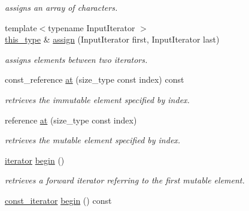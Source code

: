 \begin{DoxyCompactItemize}
\begin{DoxyCompactList}\small\item\em assigns an array of characters. \end{DoxyCompactList}\item 
\hypertarget{classhryky_1_1_string_aa9cd66f59bbf315959cdcf1e4dd627a2}{{\footnotesize template$<$typename Input\-Iterator $>$ }\\\hyperlink{classhryky_1_1_string}{this\-\_\-type} \& \hyperlink{classhryky_1_1_string_aa9cd66f59bbf315959cdcf1e4dd627a2}{assign} (Input\-Iterator first, Input\-Iterator last)}\label{classhryky_1_1_string_aa9cd66f59bbf315959cdcf1e4dd627a2}

\begin{DoxyCompactList}\small\item\em assigns elements between two iterators. \end{DoxyCompactList}\item 
\hypertarget{classhryky_1_1_string_a94674af895596884bb7f365e922afb9d}{const\-\_\-reference \hyperlink{classhryky_1_1_string_a94674af895596884bb7f365e922afb9d}{at} (size\-\_\-type const index) const }\label{classhryky_1_1_string_a94674af895596884bb7f365e922afb9d}

\begin{DoxyCompactList}\small\item\em retrieves the immutable element specified by index. \end{DoxyCompactList}\item 
\hypertarget{classhryky_1_1_string_a73cc0252b25bad7447d79d405a2d92ba}{reference \hyperlink{classhryky_1_1_string_a73cc0252b25bad7447d79d405a2d92ba}{at} (size\-\_\-type const index)}\label{classhryky_1_1_string_a73cc0252b25bad7447d79d405a2d92ba}

\begin{DoxyCompactList}\small\item\em retrieves the mutable element specified by index. \end{DoxyCompactList}\item 
\hypertarget{classhryky_1_1_string_a92a226785218c05625b4b7278dcfc2bc}{\hyperlink{classhryky_1_1iterator_1_1random_1_1_mutable}{iterator} \hyperlink{classhryky_1_1_string_a92a226785218c05625b4b7278dcfc2bc}{begin} ()}\label{classhryky_1_1_string_a92a226785218c05625b4b7278dcfc2bc}

\begin{DoxyCompactList}\small\item\em retrieves a forward iterator referring to the first mutable element. \end{DoxyCompactList}\item 
\hypertarget{classhryky_1_1_string_a7f2317d6159493bd53dfeacaaa681022}{\hyperlink{classhryky_1_1iterator_1_1random_1_1_immutable}{const\-\_\-iterator} \hyperlink{classhryky_1_1_string_a7f2317d6159493bd53dfeacaaa681022}{begin} () const }\label{classhryky_1_1_string_a7f2317d6159493bd53dfeacaaa681022}


\end{DoxyCompactItemize}
